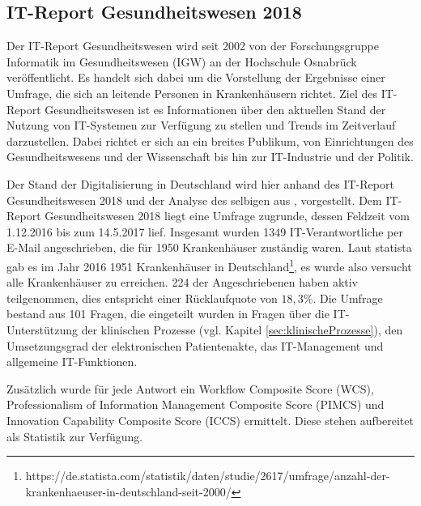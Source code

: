 \subsection{IT-Report Gesundheitswesen 2018}
Der IT-Report Gesundheitswesen wird seit 2002 von der Forschungsgruppe Informatik im Gesundheitswesen (IGW) an der Hochschule Osnabrück veröffentlicht. Es handelt sich dabei um die Vorstellung der Ergebnisse einer Umfrage, die sich an leitende Personen in Krankenhäusern richtet. Ziel des IT-Report Gesundheitswesen ist es Informationen über den aktuellen Stand der Nutzung von IT-Systemen zur Verfügung zu stellen und Trends im Zeitverlauf darzustellen. Dabei richtet er sich an ein breites Publikum, von Einrichtungen des Gesundheitswesens und der Wissenschaft bis hin zur IT-Industrie und der Politik.\parencite{huebner2019}

Der Stand der Digitalisierung in Deutschland wird hier anhand des IT-Report Gesundheitswesen 2018 \parencite{huebner2018} und der Analyse des selbigen aus \cite{huebner2019}, vorgestellt. Dem IT-Report Gesundheitswesen 2018 liegt eine Umfrage zugrunde, dessen Feldzeit vom 1.12.2016 bis zum 14.5.2017 lief. Insgesamt wurden 1349 IT-Verantwortliche per E-Mail angeschrieben, die für 1950 Krankenhäuser zuständig waren. Laut statista gab es im Jahr 2016 1951 Krankenhäuser in Deutschland\footnote{https://de.statista.com/statistik/daten/studie/2617/umfrage/anzahl-der-krankenhaeuser-in-deutschland-seit-2000/}, es wurde also versucht alle Krankenhäuser zu erreichen. 224 der Angeschriebenen haben aktiv teilgenommen, dies entspricht einer Rücklaufquote von $18,3\%$. Die Umfrage bestand aus 101 Fragen, die eingeteilt wurden in Fragen über die IT-Unterstützung der klinischen Prozesse (vgl. Kapitel \ref{sec:klinischeProzesse}), den Umsetzungsgrad der elektronischen Patientenakte, das IT-Management und allgemeine IT-Funktionen.

Zusätzlich wurde für jede Antwort ein Workflow Composite Score (WCS), Professionalism of Information Management Composite Score (PIMCS) und Innovation Capability Composite Score (ICCS) ermittelt. Diese stehen aufbereitet als Statistik zur Verfügung.
